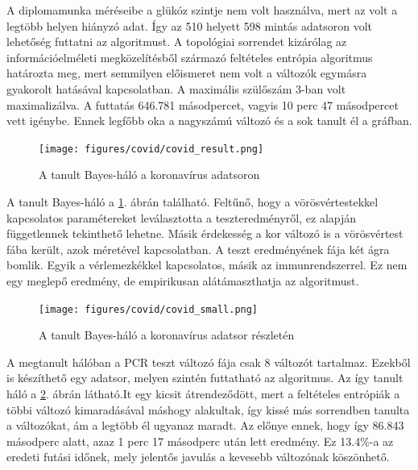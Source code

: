 A diplomamunka méréseibe a glükóz szintje nem volt használva, mert az volt a legtöbb helyen hiányzó adat. Így az 510 helyett 598 mintás adatsoron volt lehetőség futtatni az algoritmust. A topológiai sorrendet kizárólag az információelméleti megközelítésből származó feltételes entrópia algoritmus határozta meg, mert semmilyen előismeret nem volt a változók egymásra gyakorolt hatásával kapcsolatban. A maximális szülőszám 3-ban volt maximalizálva. A futtatás 646.781 másodpercet, vagyis 10 perc 47 másodpercet vett igénybe. Ennek legfőbb oka a nagyszámú változó és a sok tanult él a gráfban.

\begin{figure}[htp]
    \centering
    \texttt{[image: figures/covid/covid\_result.png]}
    \caption{A tanult Bayes-háló a koronavírus adatsoron}
    \label{fig:covid_result}
\end{figure}

A tanult Bayes-háló a \ref{fig:covid_result}. ábrán található. Feltűnő, hogy a vörösvértestekkel kapcsolatos paramétereket leválasztotta a teszteredményről, ez alapján függetlennek tekinthető lehetne. Másik érdekesség a kor változó is a vörösvértest fába került, azok méretével kapcsolatban. A teszt eredményének fája két ágra bomlik. Egyik a vérlemezkékkel kapcsolatos, másik az immunrendszerrel. Ez nem egy meglepő eredmény, de empirikusan alátámaszthatja az algoritmust.

\begin{figure}[htp]
    \centering
    \texttt{[image: figures/covid/covid\_small.png]}
    \caption{A tanult Bayes-háló a koronavírus adatsor részletén}
    \label{fig:covid_small_result}
\end{figure}

A megtanult hálóban a PCR teszt változó fája csak 8 változót tartalmaz. Ezekből is készíthető egy adatsor, melyen szintén futtatható az algoritmus. Az így tanult háló a \ref{fig:covid_small_result}. ábrán látható.It egy kicsit átrendeződött, mert a feltételes entrópiák a többi változó kimaradásával máshogy alakultak, így kissé más sorrendben tanulta a változókat, ám a legtöbb él ugyanaz maradt. Az előnye ennek, hogy így 86.843 másodperc alatt, azaz 1 perc 17 másodperc után lett eredmény. Ez 13.4\%-a az eredeti futási időnek, mely jelentős javulás a kevesebb változónak köszönhető.

